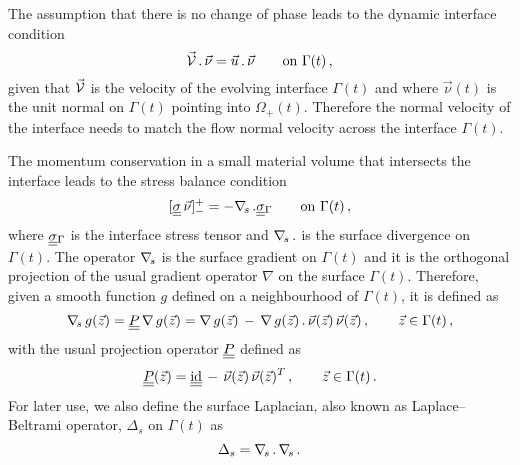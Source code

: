 The assumption that there is no change of phase leads to the dynamic interface
condition
\begin{equation} \label{eq:interface_velocity}
\vec{\mathcal{V}}\,.\,\vec\nu = \vec u\,.\,\vec \nu \qquad \mbox{on }
\Gamma(t)\,,
\end{equation}
given that $\vec{\mathcal{V}}$ is the velocity of the evolving interface
$\Gamma(t)$ and where $\vec\nu(t)$ is the unit normal on $\Gamma(t)$ pointing
into $\Omega_+(t)$. Therefore the normal velocity of the interface needs to
match the flow normal velocity across the interface $\Gamma(t)$.

The momentum conservation in a small material volume that intersects the
interface leads to the stress balance condition
\begin{equation}\label{eq:interface_jump_stress_div}
[\mat\sigma\,\vec \nu]_-^+ = -\nabs\,.\mat\sigma_{\Gamma} \qquad \mbox{on }
\Gamma(t)\,,
\end{equation}
where $\mat\sigma_{\Gamma}$ is the interface stress tensor and $\nabla_{\!s}\,.$ is
the surface divergence on $\Gamma(t)$. The operator $\nabla_{\!s}$ is the surface
gradient on $\Gamma(t)$ and it is the orthogonal projection of the usual
gradient operator $\nabla$ on the surface $\Gamma(t)$. Therefore, given a
smooth function $g$ defined on a neighbourhood of $\Gamma(t)$, it is defined as
\begin{equation}\label{eq:surface_gradient}
\nabs\,g(\vec z)=\mat P\,\nabla\,g(\vec z)=\nabla\,g(\vec z)\,-
\,\nabla\,g(\vec z)\,.\,\vec\nu(\vec z)\,\vec\nu(\vec z)\,,\qquad \vec z
\in\Gamma(t)\,,
\end{equation}
with the usual projection operator $\mat P$ defined as
\begin{equation}\label{eq:surface_projection}
\mat P(\vec z)=\mat\id\,-\,\vec\nu(\vec z)\,\vec\nu(\vec z)^T\,,\qquad \vec
z\in \Gamma(t)\,.
\end{equation}
For later use, we also define the surface Laplacian, also
known as Laplace--Beltrami operator, $\Delta_s$ on
$\Gamma(t)$ as
\begin{equation}\label{eq:surface_laplacian}
\Delta_s = \nabla_{\!s}\,.\,\nabla_{\!s}\,.
\end{equation}

